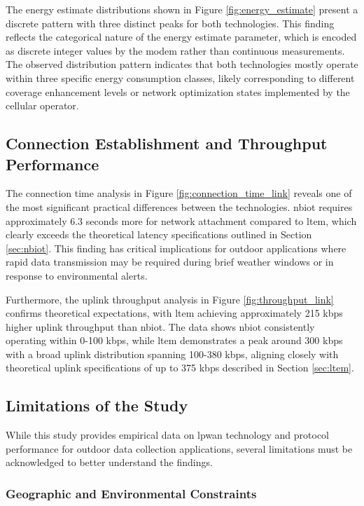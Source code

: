 \documentclass[12pt, english, openany]{book}
\begin{document}
The energy estimate distributions shown in Figure \ref{fig:energy_estimate} present a discrete pattern with three distinct peaks for both technologies. This finding reflects the categorical nature of the energy estimate parameter, which is encoded as discrete integer values by the modem rather than continuous measurements. The observed distribution pattern indicates that both technologies mostly operate within three specific energy consumption classes, likely corresponding to different coverage enhancement levels or network optimization states implemented by the cellular operator.

\subsection{Connection Establishment and Throughput Performance}

The connection time analysis in Figure \ref{fig:connection_time_link} reveals one of the most significant practical differences between the technologies. \gls{nbiot} requires approximately 6.3 seconds more for network attachment compared to \gls{ltem}, which clearly exceeds the theoretical latency specifications outlined in Section \ref{sec:nbiot}. This finding has critical implications for outdoor applications where rapid data transmission may be required during brief weather windows or in response to environmental alerts.

Furthermore, the uplink throughput analysis in Figure \ref{fig:throughput_link} confirms theoretical expectations, with \gls{ltem} achieving approximately 215 kbps higher uplink throughput than \gls{nbiot}. The data shows \gls{nbiot} consistently operating within 0-100 kbps, while \gls{ltem} demonstrates a peak around 300 kbps with a broad uplink distribution spanning 100-380 kbps, aligning closely with theoretical uplink specifications of up to 375 kbps described in Section \ref{sec:ltem}.

\subsection{Limitations of the Study}

While this study provides empirical data on \gls{lpwan} technology and protocol performance for outdoor data collection applications, several limitations must be acknowledged to better understand the findings.

\subsubsection*{Geographic and Environmental Constraints}
\end{document}
